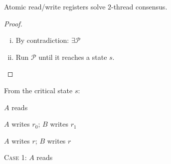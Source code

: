 \begin{frame}{}
  \begin{columns}
      \pause
  \end{columns}
\end{frame}

\begin{frame}{}
  \begin{theorem}
    Atomic read/write registers  solve $2$-thread consensus.
  \end{theorem}

  \pause
  \vspace{0.60cm}
  \begin{proof}
    \begin{enumerate}[(i)]
      \item By contradiction: $\exists \mathcal{P}$
      \pause
      \item Run $\mathcal{P}$ until it reaches a  state $s$.
    \end{enumerate}

    \pause
    \vspace{0.50cm}
    \centerline{}
  \end{proof}
\end{frame}

\begin{frame}{}
  From the critical state $s$:
  \begin{description}
    \setlength{\itemsep}{10pt}
    \item[\textsc{Case 1}] $A$ reads
    \item[\textsc{Case 2}] $A$ writes $r_0$; \quad $B$ writes $r_1$
    \item[\textsc{Case 3}] $A$ writes $r$; \quad $B$ writes $r$
  \end{description}
\end{frame}

\begin{frame}{}
  \begin{center}
    \resizebox{0.50\textwidth}{!}{}
  \end{center}

  \centerline{\Large \textsc{Case 1}: $A$ reads}
\end{frame}

